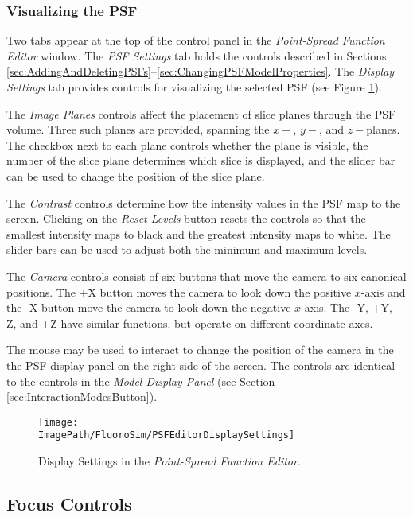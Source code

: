 \documentclass[11pt,titlepage,twoside]{article}
\begin{document}
\subsubsection{Visualizing the PSF}

Two tabs appear at the top of the control panel in the \emph{Point-Spread Function Editor} window. The \emph{PSF Settings} tab holds the controls described in Sections \ref{sec:AddingAndDeletingPSFs}--\ref{sec:ChangingPSFModelProperties}. The \emph{Display Settings} tab provides controls for visualizing the selected PSF (see Figure \ref{fig:PSFEditorDisplaySettings}).

The \emph{Image Planes} controls affect the placement of slice planes through the PSF volume. Three such planes are provided, spanning the $x-$, $y-$, and $z-$planes. The checkbox next to each plane controls whether the plane is visible, the number of the slice plane determines which slice is displayed, and the slider bar can be used to change the position of the slice plane.

The \emph{Contrast} controls determine how the intensity values in the PSF map to the screen. Clicking on the \emph{Reset Levels} button resets the controls so that the smallest intensity maps to black and the greatest intensity maps to white. The slider bars can be used to adjust both the minimum and maximum levels.

The \emph{Camera} controls consist of six buttons that move the camera to six canonical positions. The +X button moves the camera to look down the positive $x$-axis and the -X button move the camera to look down the negative $x$-axis. The -Y, +Y, -Z, and +Z have similar functions, but operate on different coordinate axes.

The mouse may be used to interact to change the position of the camera in the the PSF display panel on the right side of the screen. The controls are identical to the controls in the \emph{Model Display Panel} (see Section \ref{sec:InteractionModesButton}).

\begin{figure}[htbp] %
   \centering
   \texttt{[image: \\ImagePath/FluoroSim/PSFEditorDisplaySettings]} 
   \caption{Display Settings in the \emph{Point-Spread Function Editor}.}
   \label{fig:PSFEditorDisplaySettings}
\end{figure}

\subsection{Focus Controls}
\label{sec:FocusControls}
\end{document}

